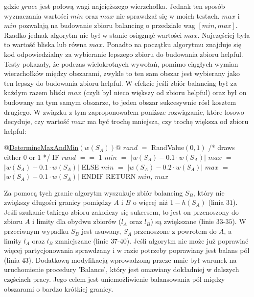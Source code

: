 \label{code:old_min_max}
\vspace{3mm}
gdzie $grace$ jest połową wagi najcięższego wierzchołka.
Jednak ten sposób wyznaczania wartości $min$ oraz $max$ nie sprawdzał się w moich testach.
$max$ i $min$ pozwalają na budowanie zbioru balancing o przedziale wag $[min, max]$.
Rzadko jednak algorytm nie był w stanie osiągnąć wartości $max$.
Najczęściej była to wartość bliska lub równa $max$.
Ponadto na początku algorytmu znajduje się kod odpowiedzialny za wybieranie lepszego zbioru do budowania zbioru helpful.
Testy pokazały, że podczas wielokrotnych wywołań, pomimo ciągłych wymian wierzchołków między obszarami,
zwykle to ten sam obszar jest wybierany jako ten lepszy do budowania zbioru helpful.
W efekcie jeśli zbiór balancing był za każdym razem bliski $max$ (czyli był nieco większy od zbioru helpful) oraz
był on budowany na tym samym obszarze, to jeden obszar sukcesywnie rósł kosztem drugiego.
W związku z tym zaproponowałem poniższe rozwiązanie, które losowo decyduje, czy wartość $max$ ma być trochę mniejsza, czy
trochę większa od zbioru helpful:
\vspace{-3mm}
\begin{pseudocode}
@\underline{DetermineMaxAndMin$(w(S_A))$}@
  $rand$ $=$ RandValue$(0,1)$   /* draws either $0$ or $1$ */
  IF $rand$ $==$ $1$
    $min$ $=$ $| w(S_A) - 0.1 \cdot w(S_A) |$
    $max$ $=$ $| w(S_A) + 0.1 \cdot w(S_A) |$
  ELSE
    $min$ $=$ $| w(S_A) - 0.2 \cdot w(S_A) |$
    $max$ $=$ $| w(S_A) - 0.1 \cdot w(S_A) |$
  ENDIF
  RETURN $min$, $max$
\end{pseudocode}
\vspace{-13mm}
\label{code:new_min_max}
\FloatBarrier

Za pomocą tych granic algorytm wyszukuje zbiór balancing $S_B$, który nie zwiększy długości granicy pomiędzy $A$ i $B$
o więcej niż $1 - h(S_A)$ (linia $31$).
Jeśli szukanie takiego zbioru zakończy się sukcesem, to jest on przenoszony do zbioru $A$ i limity dla obydwu zbiorów
($l_A$ oraz $l_B$) są zwiększane (linie $33$-$35$).
W przeciwnym wypadku $S_B$ jest usuwany, $S_A$ przenoszone z powrotem do $A$, a limity $l_A$ oraz $l_B$ zmniejszane
(linie $37$-$40$).
Jeśli algorytm nie może już poprawiać więcej partycjonowania sprawdzany i w razie potrzeby poprawiany jest balans pól
(linia $43$).
Dodatkową modyfikacją wprowadzoną przeze mnie był warunek na uruchomienie procedury 'Balance', który jest omawiany
dokładniej w dalszych częściach pracy.
Jego celem jest uniemożliwienie balansowania pól między obszarami o bardzo krótkiej granicy.
